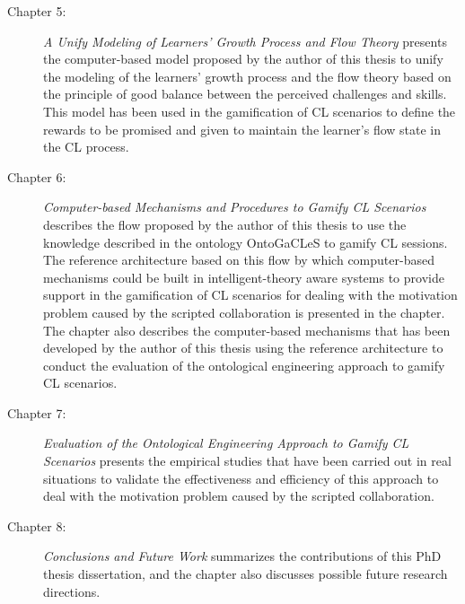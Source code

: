\begin{description}
\item[Chapter 5:]
\emph{A Unify Modeling of Learners' Growth Process and Flow Theory} presents the computer-based model proposed by the author of this thesis to unify the modeling of the learners' growth process and the flow theory based on the principle of good balance between the perceived challenges and skills. This model has been used in the gamification of CL scenarios to define the rewards to be promised and given to maintain the learner's flow state in the CL process.

\item[Chapter 6:]
\emph{Computer-based Mechanisms and Procedures to Gamify CL Scenarios} describes the flow proposed by the author of this thesis to use the knowledge described in the ontology OntoGaCLeS to gamify CL sessions. The reference architecture based on this flow by which computer-based mechanisms could be built in intelligent-theory aware systems to provide support in the gamification of CL scenarios for dealing with the motivation problem caused by the scripted collaboration is presented in the chapter. The chapter also describes the computer-based mechanisms that has been developed by the author of this thesis using the reference architecture to conduct the evaluation of the ontological engineering approach to gamify CL scenarios.

\item[Chapter 7:]
\emph{Evaluation of the Ontological Engineering Approach to Gamify CL Scenarios} presents the empirical studies that have been carried out in real situations to validate the effectiveness and efficiency of this approach to deal with the motivation problem caused by the scripted collaboration.

\item[Chapter 8:]
\emph{Conclusions and Future Work} summarizes the contributions of this PhD thesis dissertation, and the chapter also discusses possible future research directions.

\end{description}




